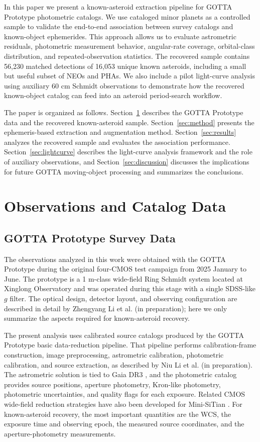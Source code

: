 \documentclass[referee]{raa}
\begin{document}
In this paper we present a known-asteroid extraction pipeline for GOTTA Prototype photometric catalogs. We use cataloged minor planets as a controlled sample to validate the end-to-end association between survey catalogs and known-object ephemerides. This approach allows us to evaluate astrometric residuals, photometric measurement behavior, angular-rate coverage, orbital-class distribution, and repeated-observation statistics. The recovered sample contains 56,230 matched detections of 16,053 unique known asteroids, including a small but useful subset of NEOs and PHAs. We also include a pilot light-curve analysis using auxiliary 60 cm Schmidt observations to demonstrate how the recovered known-object catalog can feed into an asteroid period-search workflow.

The paper is organized as follows. Section~\ref{sec:data} describes the GOTTA Prototype data and the recovered known-asteroid sample. Section~\ref{sec:method} presents the ephemeris-based extraction and augmentation method. Section~\ref{sec:results} analyzes the recovered sample and evaluates the association performance. Section~\ref{sec:lightcurve} describes the light-curve analysis framework and the role of auxiliary observations, and Section~\ref{sec:discussion} discusses the implications for future GOTTA moving-object processing and summarizes the conclusions.

\section{Observations and Catalog Data}
\label{sec:data}

\subsection{GOTTA Prototype Survey Data}

The observations analyzed in this work were obtained with the GOTTA Prototype during the original four-CMOS test campaign from 2025 January to June. The prototype is a 1 m-class wide-field Ring Schmidt system located at Xinglong Observatory and was operated during this stage with a single SDSS-like $g$ filter. The optical design, detector layout, and observing configuration are described in detail by Zhengyang Li et al. (in preparation); here we only summarize the aspects required for known-asteroid recovery.

The present analysis uses calibrated source catalogs produced by the GOTTA Prototype basic data-reduction pipeline. That pipeline performs calibration-frame construction, image preprocessing, astrometric calibration, photometric calibration, and source extraction, as described by Niu Li et al. (in preparation). The astrometric solution is tied to Gaia DR3 \citep{Gaia2023}, and the photometric catalog provides source positions, aperture photometry, Kron-like photometry, photometric uncertainties, and quality flags for each exposure. Related CMOS wide-field reduction strategies have also been developed for Mini-SiTian \citep{Xiao2025}. For known-asteroid recovery, the most important quantities are the WCS, the exposure time and observing epoch, the measured source coordinates, and the aperture-photometry measurements.
\end{document}
